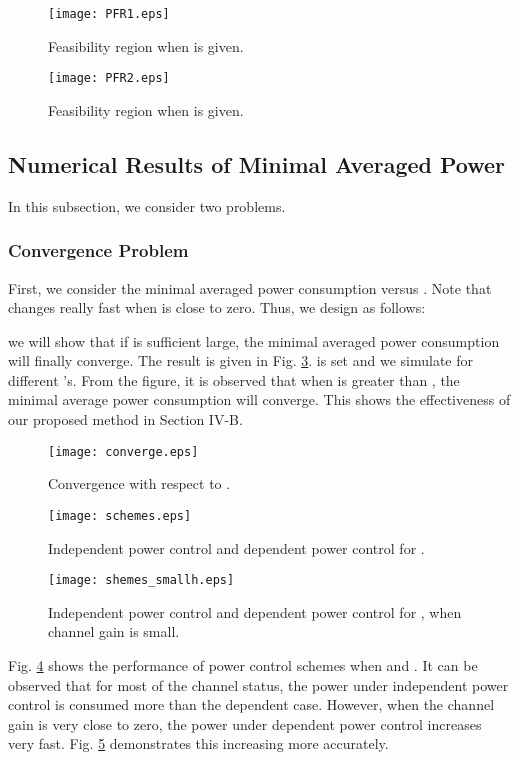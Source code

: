 \documentclass[12pt, draftclsnofoot, journal, letterpaper, onecolumn]{IEEEtran}
\begin{document}
\begin{figure}
\center
\texttt{[image: PFR1.eps]}
\center\caption{Feasibility region when  is given.}\label{PFR1}
\end{figure}
\begin{figure}
\center
\texttt{[image: PFR2.eps]}
\center\caption{Feasibility region when  is given.}\label{PFR2}
\end{figure}

\subsection{Numerical Results of Minimal Averaged Power}
In this subsection, we consider two problems.

\subsubsection{Convergence Problem}\label{convergence}
First, we consider the minimal averaged power consumption versus . Note that  changes really fast when  is close to zero. Thus, we design  as follows:

we will show that if  is sufficient large, the minimal averaged power consumption will finally converge. The result is given in Fig. \ref{convergencefig}.  is set and we simulate for different 's. From the figure, it is observed that when  is greater than , the minimal average power consumption will converge. This shows the effectiveness of our proposed method in Section IV-B.

\begin{figure}
\center
\texttt{[image: converge.eps]}
\center\caption{Convergence with respect to .}\label{convergencefig}
\end{figure}

\begin{figure}
\center
\texttt{[image: schemes.eps]}
\center\caption{Independent power control and dependent power control for .}\label{pcschemes}
\end{figure}

\begin{figure}
\center
\texttt{[image: shemes\_smallh.eps]}
\center\caption{Independent power control and dependent power control for , when channel gain is small.}\label{pcschemessmallh}
\end{figure}

Fig. \ref{pcschemes} shows the performance of power control schemes when  and . It can be observed that for most of the channel status, the power under independent power control is consumed more than the dependent case. However, when the channel gain is very close to zero, the power under dependent power control increases very fast. Fig. \ref{pcschemessmallh} demonstrates this increasing more accurately.
\end{document}
